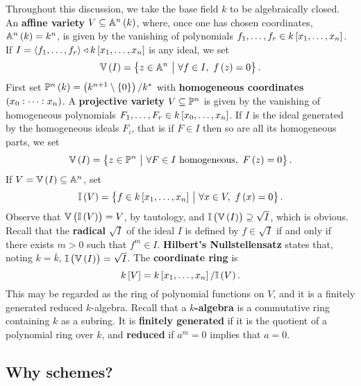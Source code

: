 Throughout this discussion, we take the base field $ k $ to be algebraically closed. An \textbf{affine variety} $ V \subseteq \AA^n\br{k} $, where, once one has chosen coordinates, $ \AA^n\br{k} = k^n $, is given by the vanishing of polynomials $ f_1, \dots, f_r \in k\sbr{x_1, \dots, x_n} $. If $ I = \abr{f_1, \dots, f_r} \triangleleft k\sbr{x_1, \dots, x_n} $ is any ideal, we set
$$ \VV\br{I} = \cbr{z \in \AA^n \st \forall f \in I, \ f\br{z} = 0}. $$
First set $ \PP^n\br{k} = \br{k^{n + 1} \setminus \cbr{0}} / k^* $ with \textbf{homogeneous coordinates} $ \br{x_0 : \dots : x_n} $. A \textbf{projective variety} $ V \subseteq \mathbb{P}^n $ is given by the vanishing of homogeneous polynomials $ F_1, \dots, F_r \in k\sbr{x_0, \dots, x_n} $. If $ I $ is the ideal generated by the homogeneous ideals $ F_i $, that is if $ F \in I $ then so are all its homogeneous parts, we set
$$ \VV\br{I} = \cbr{z \in \PP^n \st \forall F \in I \ \text{homogeneous}, \ F\br{z} = 0}. $$
If $ V = \VV\br{I} \subseteq \AA^n $, set
$$ \II\br{V} = \cbr{f \in k\sbr{x_1, \dots, x_n} \st \forall x \in V, \ f\br{x} = 0}. $$
Observe that $ \VV\br{\II\br{V}} = V $, by tautology, and $ \II\br{\VV\br{I}} \supseteq \sqrt{I} $, which is obvious. Recall that the \textbf{radical} $ \sqrt{I} $ of the ideal $ I $ is defined by $ f \in \sqrt{I} $ if and only if there exists $ m > 0 $ such that $ f^m \in I $. \textbf{Hilbert's Nullstellensatz} states that, noting $ k = \overline{k} $, $ \II\br{\VV\br{I}} = \sqrt{I} $. The \textbf{coordinate ring} is
$$ k\sbr{V} = k\sbr{x_1, \dots, x_n} / \II\br{V}. $$
This may be regarded as the ring of polynomial functions on $ V $, and it is a finitely generated reduced $ k $-algebra. Recall that a \textbf{$ k $-algebra} is a commutative ring containing $ k $ as a subring. It is \textbf{finitely generated} if it is the quotient of a polynomial ring over $ k $, and \textbf{reduced} if $ a^m = 0 $ implies that $ a = 0 $.

\subsection{Why schemes?}

